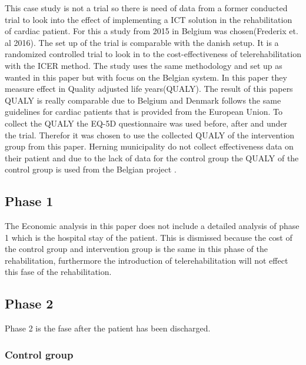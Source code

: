 This case study is not a trial so there is need of data from a former conducted trial to look into the effect of implementing a ICT solution in the rehabilitation of cardiac patient. For this a study from 2015 in Belgium was chosen(Frederix et. al 2016). The set up of the trial is comparable with the danish setup. It is a randomized controlled trial to look in to the cost-effectiveness of telerehabilitation with the ICER method. The study uses the same methodology and set up as wanted in this paper but with focus on the Belgian system. In this paper they measure effect in Quality adjusted life years(QUALY). The result of this papers QUALY is really comparable due to Belgium and Denmark follows the same guidelines for cardiac patients that is provided from the European Union. To collect the QUALY the EQ-5D questionnaire was used before, after and under the trial. Therefor it was chosen to use the collected QUALY of the intervention group from this paper. Herning municipality do not collect effectiveness data on their patient and due to the lack of data for the control group the QUALY of the control group is used from the Belgian project \cite{costeffect}.




\subsection{Phase 1}

The Economic analysis in this paper does not include a detailed analysis of phase 1 which is the hospital stay of the patient. This is dismissed because the cost of the control group and intervention group is the same in this phase of the rehabilitation, furthermore the introduction of telerehabilitation will not effect this fase of the rehabilitation. 


\subsection{Phase 2}

Phase 2 is the fase after the patient has been discharged. 





\subsubsection{Control group}

